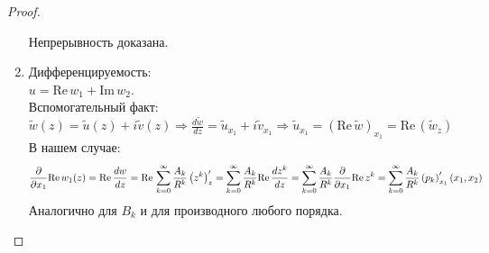 \begin{proof}
\begin{enumerate}
Непрерывность доказана.
\item Дифференцируемость:\\ 
$u = \mathrm{Re}\, w_1 + \mathrm{Im}\, w_2$.\\
Вспомогательный факт: $\tilde{w}(z) = \tilde{u}(z) + i \tilde{v}(z) \Rightarrow \frac{d \tilde{w}}{d z} = \tilde{u}_{x_1} + i \tilde{v}_{x_1} \Rightarrow  \tilde{u}_{x_1} = (\mathrm{Re}\, \tilde{w})_{x_1} = \mathrm{Re}\, (\tilde{w}_z)$\\
В нашем случае: 
\[
\frac{\partial }{\partial x_1} \mathrm{Re}\, w_1(z) = \mathrm{Re}\, \frac{dw}{dz} = \mathrm{Re}\, \sum_{k=0}^{\infty} \frac{A_k}{R^k}\left(z^k\right)'_z = \sum_{k=0}^{\infty} \frac{A_k}{R^k}\mathrm{Re}\, \frac{dz^k}{dz} = \sum_{k=0}^{\infty} \frac{A_k}{R^k}\frac{\partial }{\partial x_1}\mathrm{Re}\,z^k = \sum_{k=0}^{\infty} \frac{A_k}{R^k}\left(p_k\right)'_{x_1}(x_1,x_2)
\]
Аналогично для $B_k$ и для производного любого порядка.
\end{enumerate}
\end{proof}